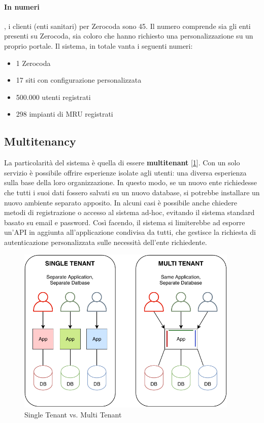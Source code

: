 \paragraph{In numeri}, i clienti (enti sanitari) per Zerocoda sono 45. Il numero comprende sia gli enti presenti su Zerocoda, sia coloro che hanno richiesto una personalizzazione su un proprio portale. Il sistema, in totale vanta i seguenti numeri:
\begin{itemize}
    \item 1 Zerocoda
    \item 17 siti con configurazione personalizzata
    \item 500.000 utenti registrati
    \item 298 impianti di MRU registrati
\end{itemize}


\subsection{Multitenancy}
La particolarità del sistema è quella di essere \textbf{multitenant} [\ref{fig:multitenancy}]. Con un solo servizio è possibile offrire esperienze isolate agli utenti: una diversa esperienza sulla base della loro organizzazione. In questo modo, se un nuovo ente richiedesse che tutti i suoi dati fossero salvati su un nuovo database, si potrebbe installare un nuovo ambiente separato apposito. In alcuni casi è possibile anche chiedere metodi di registrazione o accesso al sistema ad-hoc, evitando il sistema standard basato su email e password. Così facendo, il sistema si limiterebbe ad esporre un'API in aggiunta all'applicazione condivisa da tutti, che gestisce la richiesta di autenticazione personalizzata sulle necessità dell'ente richiedente.
\begin{figure}[H]
    \centering
    \includegraphics[width=0.94\textwidth]{images/02_3_multitenancy.pdf}
    \caption{Single Tenant vs. Multi Tenant}
    \label{fig:multitenancy}
\end{figure}

